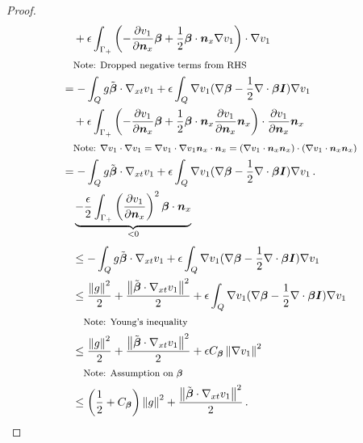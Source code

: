 \documentclass[Dissertation.tex]{subfiles}
\begin{document}
\begin{proof}
\begin{align*}
&\quad
+\epsilon\int_{\Gamma_+}\LRp{-\pd{v_1}{\bfn_x}\bfbeta
+\frac{1}{2}\bfbeta\cdot\bfn_x\Grad v_1}\cdot\Grad v_1\\
&\quad\footnotesize{\text{Note: Dropped negative terms from RHS}}
\\
%
&=-\int_Q g\tilde\bfbeta\cdot\Gradxt v_1
+\epsilon\int_Q\Grad v_1(\Grad\bfbeta-\frac{1}{2}\Div\bfbeta\bfI)\Grad v_1\\
&\quad
+\epsilon\int_{\Gamma_+}\LRp{-\pd{v_1}{\bfn_x}\bfbeta
+\frac{1}{2}\bfbeta\cdot\bfn_x\pd{v_1}{\bfn_x}\bfn_x}\cdot\pd{v_1}{\bfn_x}\bfn_x\\
&\quad\footnotesize{\text{Note: }\Grad v_1\cdot\Grad v_1=\Grad v_1\cdot\Grad v_1\bfn_x\cdot\bfn_x=
(\Grad v_1\cdot\bfn_x\bfn_x)\cdot(\Grad v_1\cdot\bfn_x\bfn_x)}
\\
%
&=-\int_Q g\tilde\bfbeta\cdot\Gradxt v_1
+\epsilon\int_Q\Grad v_1(\Grad\bfbeta-\frac{1}{2}\Div\bfbeta\bfI)\Grad v_1\,.\\
&\quad
\underbrace{-\frac{\epsilon}{2}\int_{\Gamma_+}\LRp{\pd{v_1}{\bfn_x}}^2\bfbeta\cdot\bfn_x}_{<0}
\end{align*}
\begin{align*}
%
&\leq-\int_Q g\tilde\bfbeta\cdot\Gradxt v_1
+\epsilon\int_Q\Grad v_1(\Grad\bfbeta-\frac{1}{2}\Div\bfbeta\bfI)\Grad v_1\\
%
&\leq\frac{\norm{g}^2}{2}+\frac{\norm{\tilde\bfbeta\cdot\Gradxt v_1}^2}{2}
+\epsilon\int_Q\Grad v_1(\Grad\bfbeta-\frac{1}{2}\Div\bfbeta\bfI)\Grad v_1\\
&\quad\footnotesize{\text{Note: Young's inequality}}
\\
%
&\leq\frac{\norm{g}^2}{2}+\frac{\norm{\tilde\bfbeta\cdot\Gradxt v_1}^2}{2}
+\epsilon C_{\bfbeta}\norm{\Grad v_1}^2\\
&\quad\footnotesize{\text{Note: Assumption on }\bfbeta}
\\
%
&\leq\LRp{\frac{1}{2}+C_{\bfbeta}}\norm{g}^2+\frac{\norm{\tilde\bfbeta\cdot\Gradxt v_1}^2}{2}\,.
\end{align*}
\end{proof}
\end{document}
